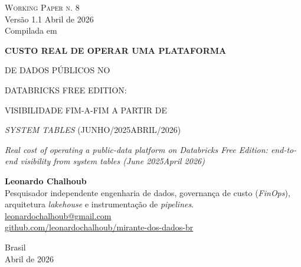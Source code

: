 \documentclass[12pt,a4paper,oneside]{article}
\begin{document}
\begin{titlepage}
  \begin{center}
    \vspace*{1.5cm}
    {\small\textsc{Working Paper n. 8}}\\
    {\small Versão 1.1 \textemdash{} Abril de 2026}\\[2pt]
    {\footnotesize Compilada em \COMPILESTAMP\ \textbullet\ \texttt{\COMPILESHA}}

    \vfill

    {\LARGE\bfseries
     CUSTO REAL DE OPERAR UMA PLATAFORMA

     DE DADOS PÚBLICOS NO

     DATABRICKS FREE EDITION:

     VISIBILIDADE FIM-A-FIM A PARTIR DE

     \textit{SYSTEM TABLES} (JUNHO/2025\textendash ABRIL/2026)}

    \vspace{1cm}
    {\large\itshape
     Real cost of operating a public-data platform on Databricks
     Free Edition: end-to-end visibility from system tables
     (June 2025\textendash April 2026)}

    \vfill

    {\large\textbf{Leonardo Chalhoub}}\\[4pt]
    {\small Pesquisador independente \textemdash{} engenharia de dados,
     governança de custo (\textit{FinOps}), arquitetura
     \textit{lakehouse} e instrumentação de \textit{pipelines}.}\\[2pt]
    {\small\href{mailto:leonardochalhoub@gmail.com}{leonardochalhoub@gmail.com}}\\
    {\small\href{https://github.com/leonardochalhoub/mirante-dos-dados-br}{github.com/leonardochalhoub/mirante-dos-dados-br}}

    \vfill

    {\small Brasil \\ Abril de 2026}
  \end{center}
\end{titlepage}

\end{document}
